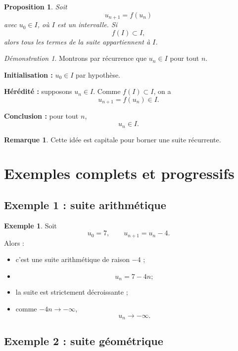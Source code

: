 \documentclass[11pt,a4paper]{article}
\theoremstyle{definition}
\newtheorem{exemple}[definition]{Exemple}
\newtheorem{remarque}[definition]{Remarque}
\theoremstyle{plain}
\newtheorem{proposition}[definition]{Proposition}
\theoremstyle{remark}
\newtheorem*{demonstrationlibre}{Démonstration}
\begin{document}
\begin{proposition}
Soit
\[
u_{n+1}=f(u_n)
\]
avec $u_0\in I$, où $I$ est un intervalle.  
Si
\[
f(I)\subset I,
\]
alors tous les termes de la suite appartiennent à $I$.
\end{proposition}

\begin{demonstrationlibre}
Montrons par récurrence que $u_n\in I$ pour tout $n$.

\textbf{Initialisation :} $u_0\in I$ par hypothèse.

\textbf{Hérédité :} supposons $u_n\in I$. Comme $f(I)\subset I$, on a
\[
u_{n+1}=f(u_n)\in I.
\]

\textbf{Conclusion :} pour tout $n$,
\[
u_n\in I.
\]
\end{demonstrationlibre}

\begin{remarque}
Cette idée est capitale pour borner une suite récurrente.
\end{remarque}

\section{Exemples complets et progressifs}

\subsection{Exemple 1 : suite arithmétique}

\begin{exemple}
Soit
\[
u_0=7,\qquad u_{n+1}=u_n-4.
\]
Alors :
\begin{itemize}[leftmargin=0.8cm]
    \item c'est une suite arithmétique de raison $-4$ ;
    \item
    \[
    u_n=7-4n ;
    \]
    \item la suite est strictement décroissante ;
    \item comme $-4n\to -\infty$,
    \[
    u_n\to -\infty.
    \]
\end{itemize}
\end{exemple}

\subsection{Exemple 2 : suite géométrique}
\end{document}
